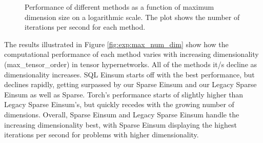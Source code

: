 \begin{figure}[H]
    \caption{Performance of different methods as a function of maximum dimension size on a logarithmic scale.
        The plot shows the number of iterations per second for each method.}
    \label{fig:exp:max_dim_size}
\end{figure}

\noindent
The results illustrated in Figure \ref{fig:exp:max_num_dim} show how the computational performance
of each method varies with increasing dimensionality (max\_tensor\_order) in tensor hypernetworks.
All of the methods it/s decline as dimensionality increases. SQL Einsum starts off with the
best performance, but declines rapidly, getting surpassed by our Sparse Einsum and our Legacy Sparse
Einsum as well as Sparse. Torch's performance starts of slightly higher than Legacy Sparse Einsum's,
but quickly recedes with the growing number of dimensions. Overall, Sparse Einsum and Legacy Sparse
Einsum handle the increasing dimensionality best, with Sparse Einsum displaying the highest iterations
per second for problems with higher dimensionality.

